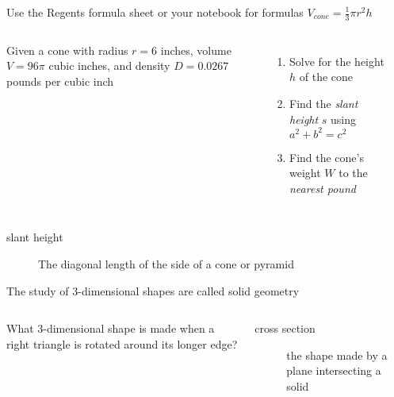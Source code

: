 \begin{frame}{Use the Regents formula sheet or your notebook for formulas}
  $V_{cone}=\frac{1}{3}\pi r^2 h$
  \begin{columns}
    Given a cone with radius $r=6$ inches, volume $V=96 \pi$ cubic inches, and density $D=0.0267$ pounds per cubic inch
    \begin{enumerate}
      \item Solve for the height $h$ of the cone
      \item Find the \emph{slant height} $s$ using $a^2+b^2=c^2$
      \item Find the cone's weight $W$ to the \emph{nearest pound}
    \end{enumerate}
    \begin{flushright}
    \end{flushright}
  \end{columns}
  \begin{description}
    \item[slant height] The diagonal length of the side of a cone or pyramid
  \end{description}
\end{frame}

\begin{frame}{The study of 3-dimensional shapes are called solid geometry}
  \begin{columns}
    What 3-dimensional shape is made when a right triangle is rotated around its longer edge? \vspace{1cm}
    \begin{description}
      \item[cross section] the shape made by a plane intersecting a solid
    \end{description}
    \begin{flushright}
    \end{flushright}
  \end{columns}
\end{frame}

